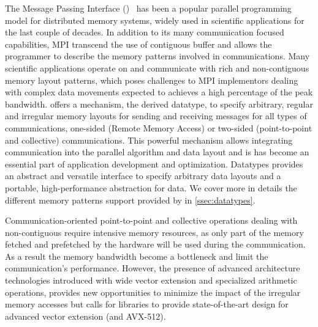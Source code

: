 \documentclass[conference]{IEEEtran}
\begin{document}
The Message Passing Interface (\mpi)~\cite{mpi-forum} has been a popular
parallel programming model for distributed memory systems, widely used in
scientific applications for the last couple of decades. In addition to its many
communication focused capabilities, MPI transcend the use of contiguous buffer
and allows the programmer to describe the memory patterns involved in
communications.
%
Many scientific applications operate on and communicate with rich and
non-contiguous memory layout patterns, which poses challenges to MPI
implementors dealing with complex data movements expected to achieves a high
percentage of the peak bandwidth.
\mpi offers a mechanism, the derived datatype, to specify arbitrary,
regular and irregular memory layouts for sending and receiving messages for all
types of communications, one-sided (Remote Memory Access) or two-sided
(point-to-point and collective) communications. This powerful mechanism allows
integrating communication into the parallel algorithm and data layout and is
has become an essential part of application development and optimization.
%
Datatypes provides an abstract and versatile interface to specify arbitrary data
layouts and a portable, high-performance abstraction for data. We cover more in
details the different memory patterns support provided by \mpi in
\ref{ssec:datatypes}.


Communication-oriented point-to-point and collective operations dealing with
non-contiguous require intensive memory resources, as only part of the memory
fetched and prefetched by the hardware will be used during the communication. As
a result  the memory bandwidth become a bottleneck and limit the communication's
performance.
%
However, the presence of advanced architecture technologies introduced with wide
vector extension and specialized arithmetic operations, provides new
opportunities to minimize the impact of the irregular memory accesses but calls
for \mpi libraries to provide state-of-the-art design for advanced vector
extension (\sve and AVX-512).
\end{document}
